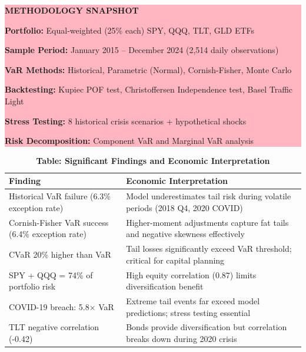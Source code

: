 \documentclass[12pt,a4paper]{article}
\begin{document}
\vspace{0.4cm}

\noindent\colorbox{lightpink}{%
\begin{minipage}{0.97\textwidth}
\vspace{0.3cm}
\textbf{\large METHODOLOGY SNAPSHOT}

\vspace{0.2cm}

\textbf{Portfolio:} Equal-weighted (25\% each) SPY, QQQ, TLT, GLD ETFs

\textbf{Sample Period:} January 2015 – December 2024 (2,514 daily observations)

\textbf{VaR Methods:} Historical, Parametric (Normal), Cornish-Fisher, Monte Carlo

\textbf{Backtesting:} Kupiec POF test, Christoffersen Independence test, Basel Traffic Light

\textbf{Stress Testing:} 8 historical crisis scenarios + hypothetical shocks

\textbf{Risk Decomposition:} Component VaR and Marginal VaR analysis

\vspace{0.3cm}
\end{minipage}
}

\vspace{0.4cm}

\begin{table}[H]
\centering
\small
\begin{tabular}{@{}p{}p{}@{}}
\toprule
\textbf{Finding} & \textbf{Economic Interpretation} \\ \midrule
Historical VaR failure (6.3\% exception rate) & Model underestimates tail risk during volatile periods (2018 Q4, 2020 COVID) \\[0.2cm]
Cornish-Fisher VaR success (6.4\% exception rate) & Higher-moment adjustments capture fat tails and negative skewness effectively \\[0.2cm]
CVaR 20\% higher than VaR & Tail losses significantly exceed VaR threshold; critical for capital planning \\[0.2cm]
SPY + QQQ = 74\% of portfolio risk & High equity correlation (0.87) limits diversification benefit \\[0.2cm]
COVID-19 breach: 5.8× VaR & Extreme tail events far exceed model predictions; stress testing essential \\[0.2cm]
TLT negative correlation (-0.42) & Bonds provide diversification but correlation breaks down during 2020 crisis \\
\bottomrule
\end{tabular}
\caption*{\textbf{Table: Significant Findings and Economic Interpretation}}
\end{table}
\end{document}
